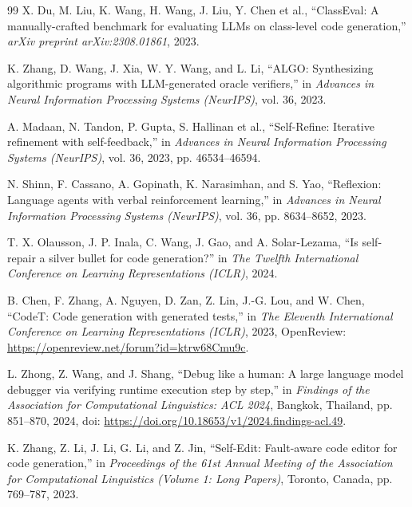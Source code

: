 \documentclass[10pt,a4paper]{article}
\begin{document}
\begin{thebibliography}{99}
X. Du, M. Liu, K. Wang, H. Wang, J. Liu, Y. Chen et al., ``ClassEval: A manually-crafted benchmark for evaluating LLMs on class-level code generation,'' \textit{arXiv preprint arXiv:2308.01861}, 2023.

K. Zhang, D. Wang, J. Xia, W. Y. Wang, and L. Li, ``ALGO: Synthesizing algorithmic programs with LLM-generated oracle verifiers,'' in \textit{Advances in Neural Information Processing Systems (NeurIPS)}, vol. 36, 2023.


A. Madaan, N. Tandon, P. Gupta, S. Hallinan et al., ``Self-Refine: Iterative refinement with self-feedback,'' in \textit{Advances in Neural Information Processing Systems (NeurIPS)}, vol. 36, 2023, pp. 46534--46594.

N. Shinn, F. Cassano, A. Gopinath, K. Narasimhan, and S. Yao, ``Reflexion: Language agents with verbal reinforcement learning,'' in \textit{Advances in Neural Information Processing Systems (NeurIPS)}, vol. 36, pp. 8634--8652, 2023.

T. X. Olausson, J. P. Inala, C. Wang, J. Gao, and A. Solar-Lezama, ``Is self-repair a silver bullet for code generation?'' in \textit{The Twelfth International Conference on Learning Representations (ICLR)}, 2024.

B. Chen, F. Zhang, A. Nguyen, D. Zan, Z. Lin, J.-G. Lou, and W. Chen, ``CodeT: Code generation with generated tests,'' in \textit{The Eleventh International Conference on Learning Representations (ICLR)}, 2023, OpenReview: \url{https://openreview.net/forum?id=ktrw68Cmu9c}.

L. Zhong, Z. Wang, and J. Shang, ``Debug like a human: A large language model debugger via verifying runtime execution step by step,'' in \textit{Findings of the Association for Computational Linguistics: ACL 2024}, Bangkok, Thailand, pp. 851--870, 2024, doi: \url{https://doi.org/10.18653/v1/2024.findings-acl.49}.

K. Zhang, Z. Li, J. Li, G. Li, and Z. Jin, ``Self-Edit: Fault-aware code editor for code generation,'' in \textit{Proceedings of the 61st Annual Meeting of the Association for Computational Linguistics (Volume 1: Long Papers)}, Toronto, Canada, pp. 769--787, 2023.


\end{thebibliography}
\end{document}
